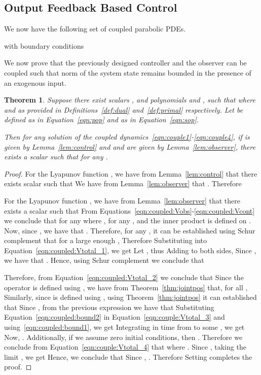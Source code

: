 \documentclass[US letter, 9 pt, conference]{ieeeconf}  \usepackage{setspace}
\newtheorem{theorem}{Theorem}
\begin{document}
\subsection{Output Feedback Based Control}
We now have the following set of coupled parabolic PDEs.

with boundary conditions


We now prove that the previously designed controller and the observer can be coupled such that norm of the system state remains bounded in the presence of an exogenous input.
\begin{theorem}\label{thm:coupled}
Suppose there exist scalars ,   and polynomials  and , such that
 where  and   as provided in Definitions~\ref{def:dual} and~\ref{def:primal} respectively. Let  be defined as in Equation~\eqref{eqn:pop} and  as in Equation~\eqref{eqn:sop}.

Then for any solution  of the coupled dynamics~\eqref{eqn:couple1}-\eqref{eqn:couple4}, if  is given by Lemma~\ref{lem:control} and   and  are given by Lemma~\ref{lem:observer}, there exists a scalar  such that
 for any .
\end{theorem}
\begin{proof}
For the Lyapunov function , we have from Lemma~\ref{lem:control} that there exists  scalar  such that
 We have from Lemma~\ref{lem:observer} that . Therefore


For the Lyapunov function , we have from Lemma~\ref{lem:observer} that there exists a scalar  such that
 From Equations~\eqref{eqn:coupled:Vobs}-\eqref{eqn:coupled:Vcont} we conclude that for any 
 where , for any , and the inner product is defined on . Now, since , we have that . Therefore, for any , it can be established using Schur complement that for a large enough ,
 Therefore
 Substituting into Equation~\eqref{eqn:coupled:Vtotal_1}, we get
 Let , thus
 Adding  to both sides,
 Since , we have that . Hence, using Schur complement we conclude that

Therefore, from Equation~\eqref{eqn:coupled:Vtotal_2} we conclude that
 Since the operator  is defined using , we have from Theorem~\ref{thm:jointpos} that, for all ,
 Similarly, since  is defined using , using Theorem~\ref{thm:jointpos} it can established that
 Since , from the previous expression we have that
 Substituting Equation~\eqref{eqn:coupled:bound2} in Equation~\eqref{eqn:couple:Vtotal_3} and using~\eqref{eqn:coupled:bound1}, we get
 Integrating in time from  to some , we get
 Now,
. Additionally, if we assume zero initial conditions, then
. Therefore we conclude from Equation~\eqref{eqn:couple:Vtotal_4} that
 where . Since , taking the limit , we get
 Hence, we conclude that
 Since , . Therefore
 Setting  completes the proof.
\end{proof}
\end{document}
